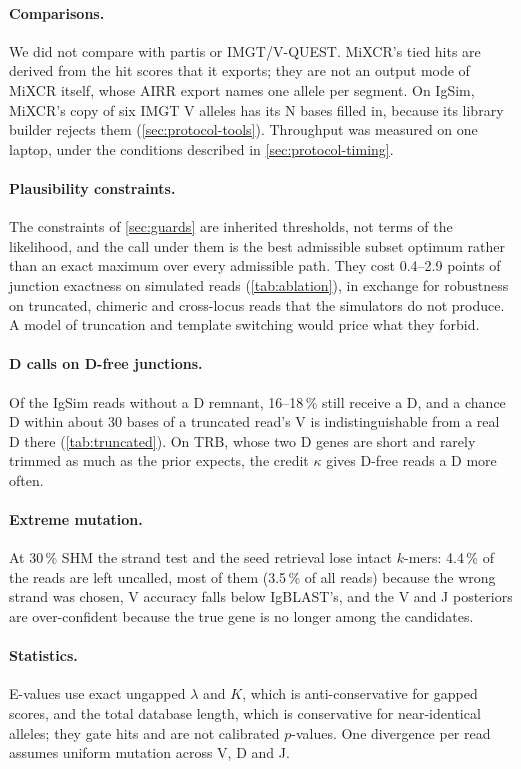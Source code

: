 \documentclass[11pt,a4paper]{article}
\begin{document}
\paragraph{Comparisons.} We did not compare with partis or IMGT/V-QUEST.
MiXCR's tied hits are derived from the hit scores that it exports; they are
not an output mode of MiXCR itself, whose AIRR export names one allele per
segment. On IgSim, MiXCR's copy of six IMGT V alleles has its N bases filled
in, because its library builder rejects them (\cref{sec:protocol-tools}).
Throughput was measured on one laptop, under the conditions described in
\cref{sec:protocol-timing}.

\paragraph{Plausibility constraints.} The constraints of \cref{sec:guards}
are inherited thresholds, not terms of the likelihood, and the call under
them is the best admissible subset optimum rather than an exact maximum over
every admissible path. They cost 0.4--2.9 points of junction exactness on
simulated reads (\cref{tab:ablation}), in exchange for robustness on
truncated, chimeric and cross-locus reads that the simulators do not
produce. A model of truncation and template switching would price what they
forbid.

\paragraph{D calls on D-free junctions.} Of the IgSim reads without a D
remnant, 16--18\,\% still receive a D, and a chance D within about 30 bases
of a truncated read's V is indistinguishable from a real D there
(\cref{tab:truncated}). On TRB, whose two D genes are short and rarely
trimmed as much as the prior expects, the credit $\kappa$ gives D-free reads
a D more often.

\paragraph{Extreme mutation.} At 30\,\% SHM the strand test and the seed
retrieval lose intact $k$-mers: 4.4\,\% of the reads are left uncalled, most
of them (3.5\,\% of all reads) because the wrong strand was chosen, V
accuracy falls below IgBLAST's, and the V and J posteriors are
over-confident because the true gene is no longer among the candidates.

\paragraph{Statistics.} E-values use exact ungapped $\lambda$ and $K$, which
is anti-conservative for gapped scores, and the total database length, which
is conservative for near-identical alleles; they gate hits and are not
calibrated $p$-values. One divergence per read assumes uniform mutation
across V, D and J.
\end{document}
